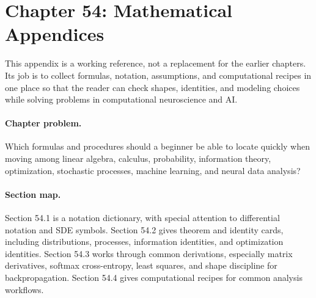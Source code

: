 \section{Chapter 54: Mathematical Appendices}
\label{ch:mathematical-appendices}

This appendix is a working reference, not a replacement for the earlier chapters. Its job is to collect formulas, notation, assumptions, and computational recipes in one place so that the reader can check shapes, identities, and modeling choices while solving problems in computational neuroscience and AI.

\paragraph{Chapter problem.}
Which formulas and procedures should a beginner be able to locate quickly when moving among linear algebra, calculus, probability, information theory, optimization, stochastic processes, machine learning, and neural data analysis?

\paragraph{Section map.}
Section 54.1 is a notation dictionary, with special attention to differential notation and SDE symbols. Section 54.2 gives theorem and identity cards, including distributions, processes, information identities, and optimization identities. Section 54.3 works through common derivations, especially matrix derivatives, softmax cross-entropy, least squares, and shape discipline for backpropagation. Section 54.4 gives computational recipes for common analysis workflows.

